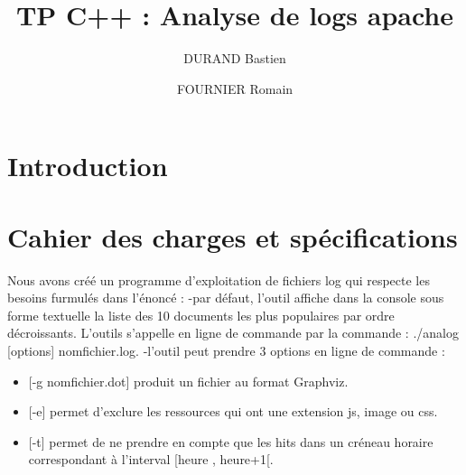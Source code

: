 \documentclass[a4paper]{article}
\title{TP C++ \no 4 : 
\bigbreak
Analyse de logs apache
}
\author{DURAND Bastien \and FOURNIER Romain}
\begin{document}
\maketitle
\thispagestyle{fancy}

\tableofcontents
\smallbreak

\section*{Introduction}\noindent
\newpage

\section{Cahier des charges et spécifications}\noindent
	
	Nous avons créé un programme d'exploitation de fichiers log qui respecte les besoins furmulés dans l'énoncé :
	-par défaut, l'outil affiche dans la console sous forme textuelle la liste des 10 documents les plus populaires par ordre décroissants. L'outils s'appelle en ligne de commande par la commande : ./analog [options] nomfichier.log.
	-l'outil peut prendre 3 options en ligne de commande :
	\begin{itemize}
		\item{} [-g nomfichier.dot] produit un fichier au format Graphviz.
		\item{} [-e] permet d'exclure les ressources qui ont une extension js, image ou css.
		\item{} [-t] permet de ne prendre en compte que les hits dans un créneau horaire correspondant à l'interval [heure , heure+1[.
	\end{itemize}
	
\end{document}
